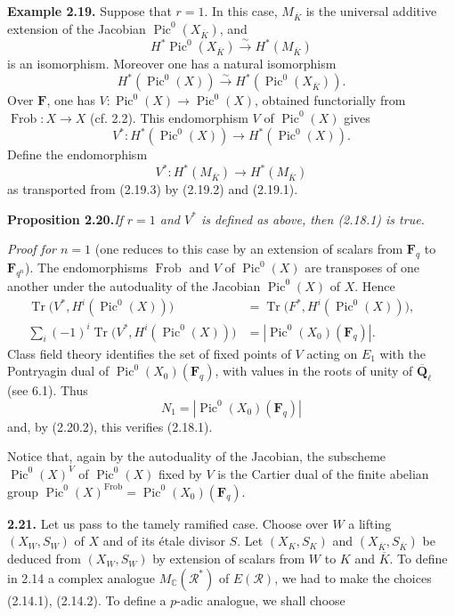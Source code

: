 \documentclass[11pt]{article}
\newcommand{\Fq}{\mathbf{F}_q}
\newcommand{\Fqn}{\mathbf{F}_{q^n}}
\newcommand{\F}{\mathbf{F}}
\newcommand{\Qbl}{\overline{\mathbf{Q}}_{\ell}}
\newcommand{\Frob}{\operatorname{Frob}}
\newcommand{\Pic}{\operatorname{Pic}}
\newcommand{\Tr}{\operatorname{Tr}}
\newcommand{\C}{\mathbb{C}}
\newcommand{\Rcal}{\mathcal{R}}
\newcommand{\para}[1]{\medskip\noindent\textbf{#1}\enspace}
\begin{document}
\para{Example 2.19.} Suppose that \(r=1\). In this case, \(M_{\overline K}\) is the universal additive extension of the Jacobian \(\Pic^0(X_{\overline K})\), and
\begin{equation}
H^*\Pic^0(X_{\overline K})\xrightarrow{\sim} H^*(M_{\overline K})
\tag{2.19.1}
\end{equation}
is an isomorphism. Moreover one has a natural isomorphism
\begin{equation}
H^*(\Pic^0(X))\xrightarrow{\sim} H^*(\Pic^0(X_{\overline K})).
\tag{2.19.2}
\end{equation}
Over \(\F\), one has \(V:\Pic^0(X)\to\Pic^0(X)\), obtained functorially from \(\Frob:X\to X\) (cf. 2.2). This endomorphism \(V\) of \(\Pic^0(X)\) gives
\begin{equation}
V^*:H^*(\Pic^0(X))\to H^*(\Pic^0(X)).
\tag{2.19.3}
\end{equation}
Define the endomorphism
\begin{equation}
V^*:H^*(M_{\overline K})\to H^*(M_{\overline K})
\tag{2.19.4}
\end{equation}
as transported from (2.19.3) by (2.19.2) and (2.19.1).

\noindent\textbf{Proposition 2.20.}\quad\textit{If \(r=1\) and \(V^*\) is defined as above, then (2.18.1) is true.}

\noindent\textit{Proof for \(n=1\)} (one reduces to this case by an extension of scalars from \(\Fq\) to \(\Fqn\)). The endomorphisms \(\Frob\) and \(V\) of \(\Pic^0(X)\) are transposes of one another under the autoduality of the Jacobian \(\Pic^0(X)\) of \(X\). Hence
\begin{align}
\Tr\bigl(V^*,H^i(\Pic^0(X))\bigr)&=\Tr\bigl(F^*,H^i(\Pic^0(X))\bigr), &&\tag{2.20.1}\\
\sum_i(-1)^i\Tr\bigl(V^*,H^i(\Pic^0(X))\bigr)&=|\Pic^0(X_0)(\Fq)|. &&\tag{2.20.2}
\end{align}
Class field theory identifies the set of fixed points of \(V\) acting on \(E_1\) with the Pontryagin dual of \(\Pic^0(X_0)(\Fq)\), with values in the roots of unity of \(\Qbl\) (see 6.1). Thus
\[
N_1=|\Pic^0(X_0)(\Fq)|
\]
and, by (2.20.2), this verifies (2.18.1).

Notice that, again by the autoduality of the Jacobian, the subscheme \(\Pic^0(X)^V\) of \(\Pic^0(X)\) fixed by \(V\) is the Cartier dual of the finite abelian group \(\Pic^0(X)^{\Frob}=\Pic^0(X_0)(\Fq)\).

\para{2.21.} Let us pass to the tamely ramified case. Choose over \(W\) a lifting \((X_W,S_W)\) of \(X\) and of its étale divisor \(S\). Let \((X_K,S_K)\) and \((X_{\overline K},S_{\overline K})\) be deduced from \((X_W,S_W)\) by extension of scalars from \(W\) to \(K\) and \(\overline K\). To define in 2.14 a complex analogue \(M_\C(\Rcal^*)\) of \(E(\Rcal)\), we had to make the choices (2.14.1), (2.14.2). To define a \(p\)-adic analogue, we shall choose
\end{document}
